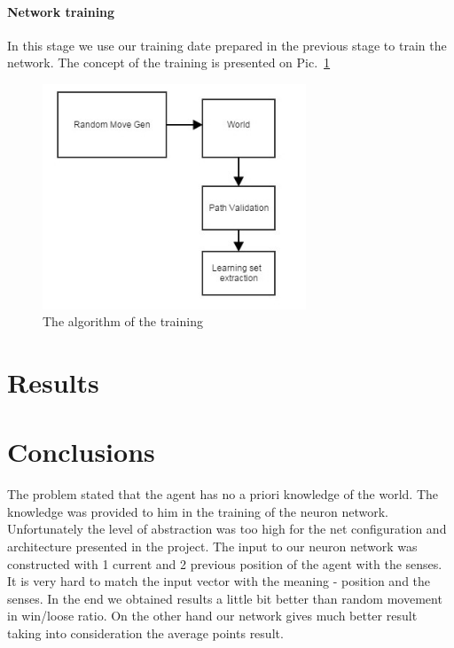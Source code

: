 \documentclass[a4paper]{article}
\begin{document}
	\paragraph{Network training}
	In this stage we use our training date prepared in the previous stage to train the network.
	The concept of the training is presented on Pic.~\ref{pic:trainDataAuto}
	 \begin{figure}[!h]
		\centering	
		\includegraphics[width=0.7\textwidth]{pic/trainDataAuto.jpg}
		\caption{The algorithm of the training}
		\label{pic:trainDataAuto}
	\end{figure}
	
	 

	\section{Results}
	
	\section{Conclusions}
	The problem stated that the agent has no a priori knowledge of the world. The knowledge was provided to him in the training of the neuron network. Unfortunately the level of abstraction was too high for the net configuration and architecture presented in the project. The input to our neuron network was constructed with 1 current and 2 previous position of the agent with the senses. It is very hard to match the input vector with the meaning - position and the senses. In the end we obtained results a little bit better than random movement in win/loose ratio. On the other hand our network gives much better result taking into consideration the average points result. 
	
\end{document}
